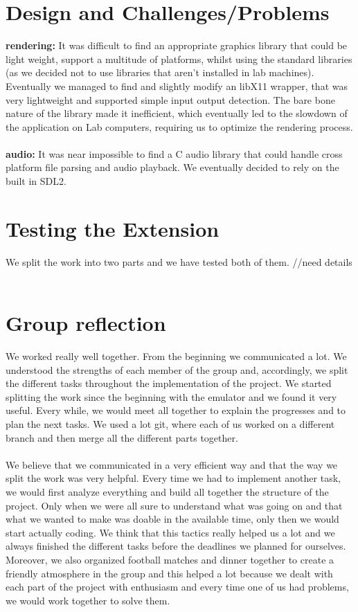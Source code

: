 \documentclass[a4paper]{article}
\begin{document}
\section{Design and Challenges/Problems}
\textbf{rendering:} It was difficult to find an appropriate graphics library that could be light weight, support a multitude of platforms, whilst using the standard libraries (as we decided not to use libraries that aren't installed in lab machines). Eventually we managed to find and slightly modify an libX11 wrapper, that was very lightweight and supported simple input output detection. The bare bone nature of the library made it inefficient, which eventually led to the slowdown of the application on Lab computers, requiring us to optimize the rendering process. 
\\\\
\textbf{audio:} It was near impossible to find a C audio library that could handle cross platform file parsing and audio playback. We eventually decided to rely on the built in SDL2.

\section{Testing the Extension}
We split the work into two parts and we have tested both of them. //need details
\\\\


\section{Group reflection}
We worked really well together. From the beginning we communicated a lot. We understood the strengths of each member of the group and, accordingly, we split the different tasks throughout the implementation of the project. We started splitting the work since the beginning with the emulator and we found it very useful. Every while, we would meet all together to explain the progresses and to plan the next tasks. We used a lot git, where each of us worked on a different branch and then merge all the different parts together. 
\\\\
We believe that we communicated in a very efficient way and that the way we split the work was very helpful. Every time we had to implement another task, we would first analyze everything and build all together the structure of the project. Only when we were all sure to understand what was going on and that what we wanted to make was doable in the available time, only then we would start actually coding. We think that this tactics really helped us a lot and we always finished the different tasks before the deadlines we planned for ourselves. Moreover, we also organized football matches and dinner together to create a friendly atmosphere in the group and this helped a lot because we dealt with each part of the project with enthusiasm and every time one of us had problems, we would work together to solve them.
\end{document}
